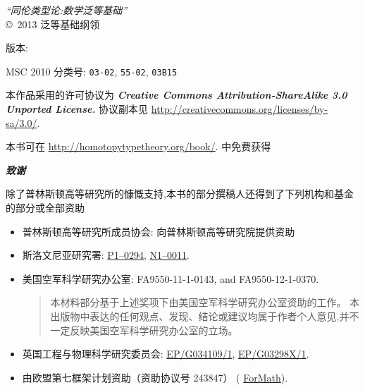 \hbox{}
\vfill

{\small
\noindent
\emph{``同伦类型论:数学泛等基础''}\\
\copyright\ 2013 泛等基础纲领

\medskip
\noindent
版本: \texttt{\OPTversion}

\medskip
\noindent
MSC 2010 分类号:
\texttt{03-02},
\texttt{55-02},
\texttt{03B15}

\bigskip
\footnotesize

\noindent
本作品采用的许可协议为
\textbf{\emph{Creative Commons Attribution-ShareAlike 3.0 Unported License.}}
%
协议副本见
\url{http://creativecommons.org/licenses/by-sa/3.0/}.

\bigskip

\noindent
本书可在 \url{http://homotopytypetheory.org/book/}. 中免费获得

\bigskip

\noindent
\emph{\textbf{\small 致谢}}

\medskip

\noindent
除了普林斯顿高等研究所的慷慨支持,本书的部分撰稿人还得到了下列机构和基金的部分或全部资助
%
\begin{itemize}
\item 普林斯顿高等研究所成员协会: 向普林斯顿高等研究院提供资助 %
\item 斯洛文尼亚研究署:  %
\href{http://www.sicris.si/search/prg.aspx?id=6120}{P1--0294},
\href{http://www.sicris.si/search/prj.aspx?id=7109}{N1--0011}.

\item 美国空军科学研究办公室:
  FA9550-11-1-0143, and %
  FA9550-12-1-0370.  %
  {
    \setlength{\parskip}{0pt}
    \begin{quote}
      \noindent\scriptsize
      本材料部分基于上述奖项下由美国空军科学研究办公室资助的工作。
      本出版物中表达的任何观点、发现、结论或建议均属于作者个人意见,并不一定反映美国空军科学研究办公室的立场。
    \end{quote}
  }

\item 英国工程与物理科学研究委员会: %
   \href{http://gow.epsrc.ac.uk/NGBOViewGrant.aspx?GrantRef=EP/G034109/1}{EP/G034109/1}, %
   \href{http://gow.epsrc.ac.uk/NGBOViewGrant.aspx?GrantRef=EP/G03298X/1}{EP/G03298X/1}. %

\item 由欧盟第七框架计划资助（资助协议号 243847） (%
\href{http://wiki.portal.chalmers.se/cse/pmwiki.php/ForMath/ForMath/}{ForMath}). %


\end{itemize}}
